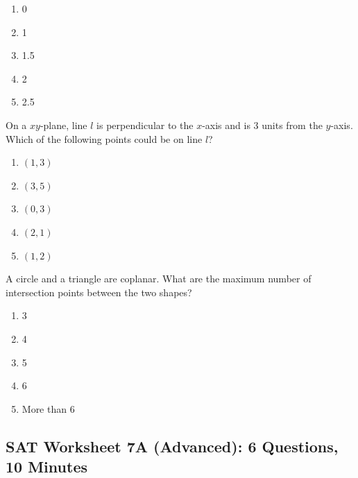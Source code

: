 \documentclass[12pt]{book}
\begin{document}
\begin{multienumerate}
{\begin{enumerate}[label=(\Alph*)]
\item 0
\item 1
\item 1.5
\item 2
\item 2.5
\end{enumerate}
}{On a $xy$-plane, line $l$ is perpendicular to the $x$-axis and is 3 units from the $y$-axis. Which of the following points could be on line $l$?

\begin{enumerate}[label=(\Alph*)]
\item $(1,3)$
\item $(3,5)$
\item $(0,3)$
\item $(2,1)$
\item $(1,2)$
\end{enumerate}}

\vfill
{}
{A circle and a triangle are coplanar. What are the maximum number of intersection points between the two shapes?

\begin{enumerate}[label=(\Alph*)]
\item 3
\item 4
\item 5
\item 6
\item More than 6
\end{enumerate}}
\end{multienumerate}

\newpage
\subsection{SAT Worksheet 7A (Advanced): 6 Questions, 10 Minutes}
\end{document}
